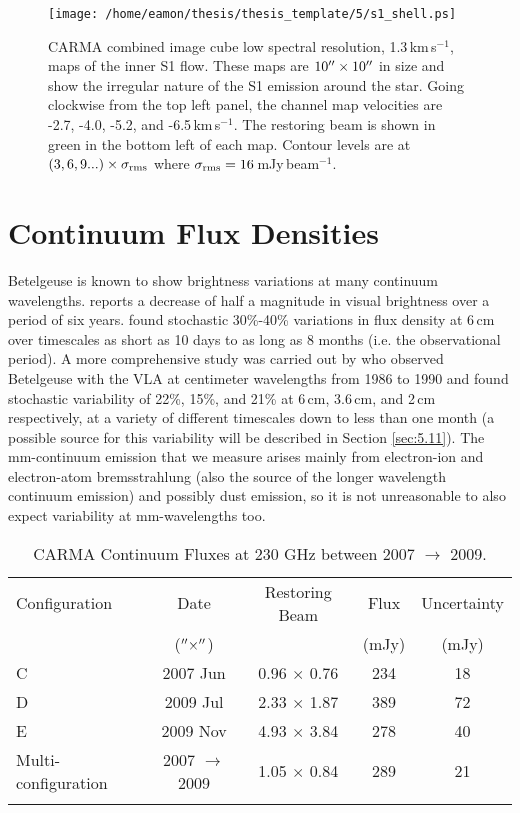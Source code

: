 \begin{figure}[!ht]
\centering 
\texttt{[image: /home/eamon/thesis/thesis\_template/5/s1\_shell.ps]}
\caption[CARMA maps of the inner S1 flow.]{CARMA combined image cube low spectral resolution, 1.3\,km\,s$^{-1}$, maps of the inner S1 flow. These maps are $10^{\prime\prime} \times 10^{\prime\prime}$ in size and show the irregular nature of the S1 emission around the star. Going clockwise from the top left panel, the channel map velocities are -2.7, -4.0, -5.2, and -6.5\,km\,s$^{-1}$. The restoring beam is shown in green in the bottom left of each map. Contour levels are at $(3,6,9...)\times \sigma _{\rm{rms}}$ where $\sigma _{\rm{rms}} = 16$\,mJy\,beam$^{-1}$.}
\label{fig:5.12a}
\end{figure}

\section{Continuum Flux Densities}\label{sec:5.9}
Betelgeuse is known to show brightness variations at many continuum wavelengths. \cite{goldberg_1984} reports a decrease of half a magnitude in visual brightness over a period of six years. \cite{bookbinder_1987} found stochastic 30\%-40\% variations in flux density at 6\,cm over timescales as short as 10 days to as long as 8 months (i.e. the observational period). A more comprehensive study was carried out by \cite{drake_1992} who observed Betelgeuse with the VLA at centimeter wavelengths from 1986 to 1990 and found stochastic variability of 22\%, 15\%, and 21\% at 6\,cm, 3.6\,cm, and 2\,cm respectively, at a variety of different timescales down to less than one month (a possible source for this variability will be described in Section \ref{sec:5.11}). The mm-continuum emission that we measure arises mainly from electron-ion and electron-atom bremsstrahlung (also the source of the longer wavelength continuum emission) and possibly dust emission, so it is not unreasonable to also expect variability at mm-wavelengths too. 

\begin{table}[!hbt]
\begin{center}
\caption[CARMA Continuum Fluxes at 230 GHz]
{CARMA Continuum Fluxes at 230 GHz between 2007 $\rightarrow$ 2009.}
\begin{tabular}{lcccc}
\hline
\hline
\rule{0pt}{2.5ex}Configuration & Date &Restoring Beam & Flux & Uncertainty \\
 & ($^{\prime\prime} \times ^{\prime\prime}$) & &(mJy) & (mJy) \\
\hline
\rule{0pt}{2.5ex}C & 2007 Jun&0.96 $\times$ 0.76 & 234 & 18\\
D & 2009 Jul&2.33 $\times$ 1.87 & 389 & 72\\
E & 2009 Nov&4.93 $\times$ 3.84 & 278 & 40 \\
Multi-configuration &2007 $\rightarrow$ 2009 &1.05 $\times$ 0.84 & 289 & 21\\
\hline
\rule{0pt}{2.0ex}
\end{tabular}
\label{tab:5.1}
\end{center}
\end{table}

